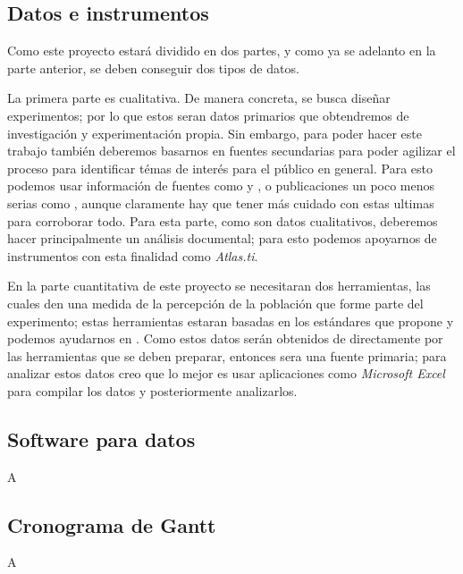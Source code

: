 \documentclass[12pt]{article}
\begin{document}
	
	\subsection {Datos e instrumentos}
		\par Como este proyecto estará dividido en dos partes, y como ya se adelanto en la parte anterior, se deben conseguir dos tipos de datos. 
		\par La primera parte es cualitativa. De manera concreta, se busca diseñar experimentos; por lo que estos seran datos primarios que obtendremos de investigación y experimentación propia. Sin embargo, para poder hacer este trabajo también deberemos basarnos en fuentes secundarias para poder agilizar el proceso para identificar témas de interés para el público en general. Para esto podemos usar información de fuentes como \cite{biot vida 1} y \cite{biot vida 2}, o publicaciones un poco menos serias como \cite{biot informal}, aunque claramente hay que tener más cuidado con estas ultimas para corroborar todo. Para esta parte, como son datos cualitativos, deberemos hacer principalmente un análisis documental; para esto podemos apoyarnos de instrumentos con esta finalidad como \textit{Atlas.ti}.
		\par En la parte cuantitativa de este proyecto se necesitaran dos herramientas, las cuales den una medida de la percepción de la población que forme parte del experimento; estas herramientas estaran basadas en los estándares que propone \cite{instrumento 1} y podemos ayudarnos en \cite{instrumento 2}. Como estos datos serán obtenidos de directamente por las herramientas que se deben preparar, entonces sera una fuente primaria; para analizar estos datos creo que lo mejor es usar aplicaciones como \textit{Microsoft Excel} para compilar los datos y posteriormente analizarlos.
		
		
		
	\subsection {Software para datos}
		\par A
	
	\subsection {Cronograma de Gantt}
		\par A
\end{document}
